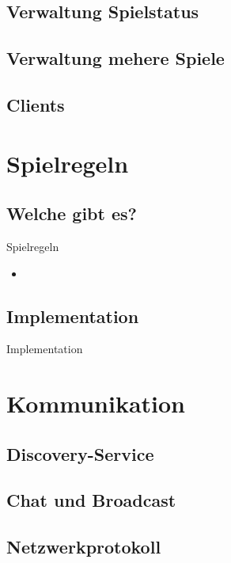 \documentclass[12pt, utf8]{beamer}
\begin{document}
\subsection{Verwaltung Spielstatus}

\subsection{Verwaltung mehere Spiele}


\subsection{Clients}

\section{Spielregeln}
\subsection{Welche gibt es?}
\begin{frame}{Spielregeln}
\begin{itemize}
\item 
\end{itemize}
\end{frame}
\subsection{Implementation}
\begin{frame}{Implementation}

\end{frame}

\section{Kommunikation}
\subsection{Discovery-Service}
\begin{frame}

\end{frame}
\subsection{Chat und Broadcast}
\begin{frame}

\end{frame}
\subsection{Netzwerkprotokoll}
\begin{frame}

\end{frame}
\end{document}

